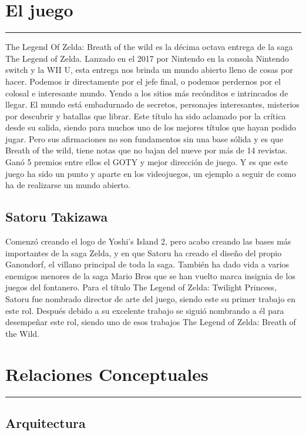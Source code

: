\documentclass[12pt]{article}
\begin{document}
\section{El juego}
    \hrule
\vspace{1cm}
The Legend Of Zelda: Breath of the wild es la décima octava entrega de la saga The Legend of Zelda. Lanzado en el 2017 por Nintendo en la consola Nintendo switch y la WII U, esta entrega nos brinda un mundo abierto lleno de cosas por hacer. Podemos ir directamente por el jefe final, o podemos perdernos por el colosal e interesante mundo. Yendo a los sitios más recónditos e intrincados de llegar.
    El mundo está embadurnado de secretos, personajes interesantes, misterios por descubrir y batallas que librar. Este título ha sido aclamado por la crítica desde su salida, siendo para muchos uno de los mejores títulos que hayan podido jugar. Pero sus afirmaciones no son fundamentos sin una base sólida y es que Breath of the wild, tiene notas que no bajan del nueve por más de 14 revistas. Ganó 5 premios entre ellos el GOTY y mejor dirección de juego. Y es que este juego ha sido un punto y aparte en los videojuegos, un ejemplo a seguir de como ha de realizarse un mundo abierto.

\subsection{Satoru Takizawa}
Comenzó creando el logo de Yoshi's Island 2, pero acabo creando las bases más importantes de la saga Zelda, y en que Satoru ha creado el diseño del propio Ganondorf, el villano principal de toda la saga. También ha dado vida a varios enemigos menores de la saga Mario Bros que se han vuelto marca insignia de los juegos del fontanero. Para el título The Legend of Zelda: Twilight Princess, Satoru fue nombrado director de arte del juego, siendo este su primer trabajo en este rol. Después debido a su excelente trabajo se siguió nombrando a él para desempeñar este rol, siendo uno de esos trabajos The Legend of Zelda: Breath of the Wild.
\section{Relaciones Conceptuales}
    \hrule
\vspace{1cm}

\subsection{Arquitectura}
\end{document}
